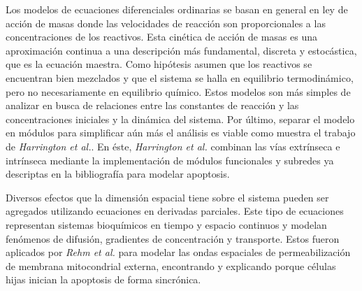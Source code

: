 
Los modelos de ecuaciones diferenciales ordinarias se basan en general en ley de acción de masas donde las velocidades de reacción son proporcionales a las concentraciones de los reactivos\cite{Spencer2011}. Esta cinética de acción de masas es una aproximación continua a una descripción más fundamental, discreta y estocástica, que es la ecuación maestra. Como hipótesis asumen que los reactivos se encuentran bien mezclados y que el sistema se halla en equilibrio termodinámico, pero no necesariamente en equilibrio químico\cite{Chen2010}.  Estos modelos son más simples de analizar en busca de relaciones entre las constantes de reacción y las concentraciones iniciales y la dinámica del sistema\cite{Chen2010}. Por último, separar el modelo en módulos para simplificar aún más el análisis es viable como muestra el trabajo de \textit{Harrington et al.}\cite{Harrington2008}. En éste, \textit{Harrington et al.} combinan las vías extrínseca e intrínseca mediante la implementación de módulos funcionales y subredes ya descriptas en la bibliografía para modelar apoptosis.


Diversos efectos que la dimensión espacial tiene sobre el sistema pueden ser agregados utilizando ecuaciones en derivadas parciales. Este tipo de ecuaciones representan sistemas bioquímicos en tiempo y espacio continuos y modelan fenómenos de difusión, gradientes de concentración y transporte\cite{Spencer2011}. Estos fueron aplicados por \textit{Rehm et al.}\cite{Rehm2009} para modelar las ondas espaciales de permeabilización de membrana mitocondrial externa, encontrando y explicando porque células hijas inician la apoptosis de forma sincrónica.

